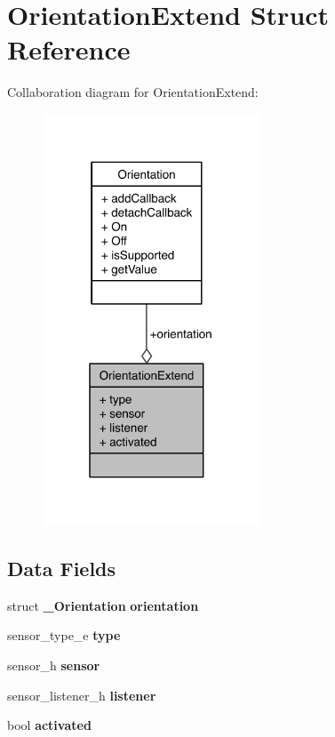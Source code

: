 \section{Orientation\-Extend Struct Reference}
\label{structOrientationExtend}


Collaboration diagram for Orientation\-Extend\-:\nopagebreak
\begin{figure}[H]
\begin{center}
\leavevmode
\includegraphics[width=183pt]{structOrientationExtend__coll__graph}
\end{center}
\end{figure}
\subsection*{Data Fields}
\begin{DoxyCompactItemize}
\item 
struct {\bf \-\_\-\-Orientation} {\bfseries orientation}\label{structOrientationExtend_a57bb5f6c7de1ecd602d7271d06ccd8c4}

\item 
sensor\-\_\-type\-\_\-e {\bfseries type}\label{structOrientationExtend_a813b31522d8267a821b55b543fc315ee}

\item 
sensor\-\_\-h {\bfseries sensor}\label{structOrientationExtend_a81c95455a5ad93feb7282dabce09b097}

\item 
sensor\-\_\-listener\-\_\-h {\bfseries listener}\label{structOrientationExtend_abf84ed65ce21492028f509eaa073ffe7}

\item 
bool {\bfseries activated}\label{structOrientationExtend_a6baf56fb0bd047c1d0ee3d80b39dca90}

\end{DoxyCompactItemize}


